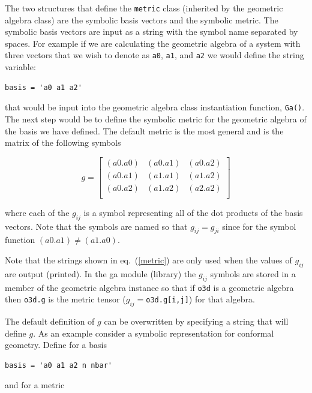 \documentclass[12pt]{report}
\newcommand{\lbrk}{\left [}
\newcommand{\rbrk}{\right ]}
\newcommand{\T}[1]{\texttt{#1}}
\begin{document}
The two structures that define the \T{metric} class (inherited by the
geometric algebra class) are the
symbolic basis vectors and the symbolic metric.  The symbolic basis
vectors are input as a string with the symbol name separated by spaces.  For
example if we are calculating the geometric algebra of a system with three
vectors that we wish to denote as \T{a0}, \T{a1}, and \T{a2} we would define the
string variable:

\begin{lstlisting}[numbers=none]
  basis = 'a0 a1 a2'
\end{lstlisting}

that would be input into the geometric algebra class instantiation function, \T{Ga()}.  The next step would be
to define the symbolic metric for the geometric algebra of the basis we
have defined. The default metric is the most general and is the matrix of
the following symbols

  \begin{equation}\label{metric}
  g = \lbrk
  \begin{array}{ccc}
    (a0.a0)   & (a0.a1)  & (a0.a2) \\
    (a0.a1) & (a1.a1)  & (a1.a2) \\
    (a0.a2) & (a1.a2) & (a2.a2) \\
  \end{array}
  \rbrk
  \end{equation}


where each of the $g_{ij}$ is a symbol representing all of the dot
products of the basis vectors. Note that the symbols are named so that
$g_{ij} = g_{ji}$ since for the symbol function
$(a0.a1) \ne (a1.a0)$.

Note that the strings shown in eq.~(\ref{metric}) are only used when the values
of $g_{ij}$ are output (printed).   In the ga module (library)
the $g_{ij}$ symbols are stored in a member of the geometric algebra
instance so that if  \T{o3d} is a geometric algebra then \T{o3d.g} is
the metric tensor ($g_{ij} = $\T{o3d.g[i,j]}) for that algebra.

The default definition of $g$ can be overwritten by specifying a string
that will define $g$. As an example consider a symbolic representation
for conformal geometry. Define for a basis

\begin{lstlisting}[numbers=none]
  basis = 'a0 a1 a2 n nbar'
\end{lstlisting}

and for a metric
\end{document}
